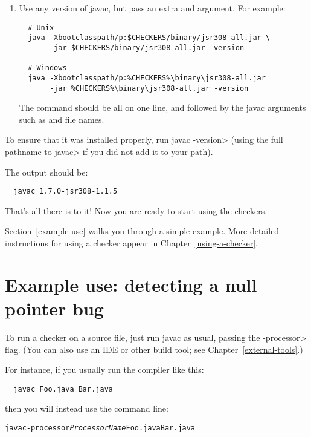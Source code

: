 \begin{enumerate}
\begin{enumerate}
\item
  Use any version of javac, but pass an extra  and
   argument.  For
  example:

\begin{Verbatim}
  # Unix
  java -Xbootclasspath/p:$CHECKERS/binary/jsr308-all.jar \
       -jar $CHECKERS/binary/jsr308-all.jar -version

  # Windows
  java -Xbootclasspath/p:%CHECKERS%\binary\jsr308-all.jar
       -jar %CHECKERS%\binary\jsr308-all.jar -version
\end{Verbatim}

The command should be all on one line, and followed by the javac arguments
such as \code{-processor} and file names.

\end{enumerate}

\end{enumerate}

To ensure that it was installed properly, run \<javac -version> (using the
full pathname to \<javac> if you did not add it to your path).

The output should be:

\begin{Verbatim}
  javac 1.7.0-jsr308-1.1.5
\end{Verbatim}

That's all there is to it!  Now you are ready to start using the checkers.

Section~\ref{example-use} walks you through a simple example.  More detailed
instructions for using a checker appear in Chapter~\ref{using-a-checker}.


\section{Example use:  detecting a null pointer bug\label{example-use}}

To run a checker on a source file, just run javac as usual, passing the
\<-processor> flag.  (You can also use an IDE or other build tool; see
Chapter~\ref{external-tools}.)

For instance, if you usually run the compiler like
this:

\begin{Verbatim}
  javac Foo.java Bar.java
\end{Verbatim}

\noindent
then you will instead use the command line:

\begin{alltt}
  javac -processor \textit{ProcessorName} Foo.java Bar.java
\end{alltt}

